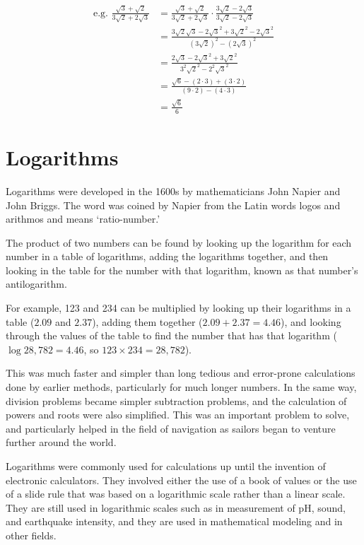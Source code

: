 \documentclass{article}
\begin{document}
\begin{align*}
\text{e.g. }
\frac{\sqrt{3}+\sqrt{2}}
{3\sqrt{2}+2\sqrt{3}}
&=\frac{\sqrt{3}+\sqrt{2}}
{3\sqrt{2}+2\sqrt{3}}\cdot
\frac{3\sqrt{2}-2\sqrt{3}}
{3\sqrt{2}-2\sqrt{3}}\\
&=\frac{3\sqrt{2}\sqrt{3}
-2{\sqrt{3}}^2
+3{\sqrt{2}}^2
-2{\sqrt{3}}^2}
{(3\sqrt{2})^2-(2\sqrt{3})^2}\\
&=\frac{2\sqrt{3}-2{\sqrt{3}}^2+3{\sqrt{2}}^2}
{3^2{\sqrt{2}}^2-2^2{\sqrt{3}}^2}\\
&=\frac{\sqrt{6}-(2\cdot3)+(3\cdot2)}{(9\cdot2)-(4\cdot3)}\\
&=\frac{\sqrt{6}}{6}
\end{align*}

\section{Logarithms}
Logarithms were developed in the 1600s by mathematicians John Napier and John Briggs. The word was coined by Napier from the Latin words logos and arithmos and means ‘ratio-number.’

The product of two numbers can be found by looking up the logarithm for each number in a table of logarithms, adding the logarithms together, and then looking in the table for the number with that logarithm, known as that number’s antilogarithm.

For example, 123 and 234 can be multiplied by looking up their logarithms in a table ($2.09$ and $2.37$), adding them together ($2.09+2.37=4.46$), and looking through the values of the table to find the number that has that logarithm ($\log {28,782}=4.46$, so $123 \times 234=28,782$).

This was much faster and simpler than long tedious and error-prone calculations done by earlier methods, particularly for much longer numbers. In the same way, division problems became simpler subtraction problems, and the calculation of powers and roots were also simplified. This was an important problem to solve, and particularly helped in the field of navigation as sailors began to venture further around the world.

Logarithms were commonly used for calculations up until the invention of electronic calculators. They involved either the use of a book of values or the use of a slide rule that was based on a logarithmic scale rather than a linear scale. They are still used in logarithmic scales such as in measurement of pH, sound, and earthquake intensity, and they are used in mathematical modeling and in other fields.
\end{document}
